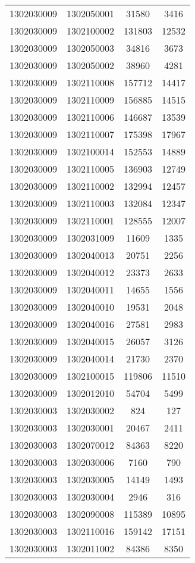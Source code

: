 \begin{longtable}{llcc}
1302030009 & 1302050001 & 31580 & 3416\\
1302030009 & 1302100002 & 131803 & 12532\\
1302030009 & 1302050003 & 34816 & 3673\\
1302030009 & 1302050002 & 38960 & 4281\\
1302030009 & 1302110008 & 157712 & 14417\\
1302030009 & 1302110009 & 156885 & 14515\\
1302030009 & 1302110006 & 146687 & 13539\\
1302030009 & 1302110007 & 175398 & 17967\\
1302030009 & 1302100014 & 152553 & 14889\\
1302030009 & 1302110005 & 136903 & 12749\\
1302030009 & 1302110002 & 132994 & 12457\\
1302030009 & 1302110003 & 132084 & 12347\\
1302030009 & 1302110001 & 128555 & 12007\\
1302030009 & 1302031009 & 11609 & 1335\\
1302030009 & 1302040013 & 20751 & 2256\\
1302030009 & 1302040012 & 23373 & 2633\\
1302030009 & 1302040011 & 14655 & 1556\\
1302030009 & 1302040010 & 19531 & 2048\\
1302030009 & 1302040016 & 27581 & 2983\\
1302030009 & 1302040015 & 26057 & 3126\\
1302030009 & 1302040014 & 21730 & 2370\\
1302030009 & 1302100015 & 119806 & 11510\\
1302030009 & 1302012010 & 54704 & 5499\\
1302030003 & 1302030002 & 824 & 127\\
1302030003 & 1302030001 & 20467 & 2411\\
1302030003 & 1302070012 & 84363 & 8220\\
1302030003 & 1302030006 & 7160 & 790\\
1302030003 & 1302030005 & 14149 & 1493\\
1302030003 & 1302030004 & 2946 & 316\\
1302030003 & 1302090008 & 115389 & 10895\\
1302030003 & 1302110016 & 159142 & 17151\\
1302030003 & 1302011002 & 84386 & 8350\\

\end{longtable}

